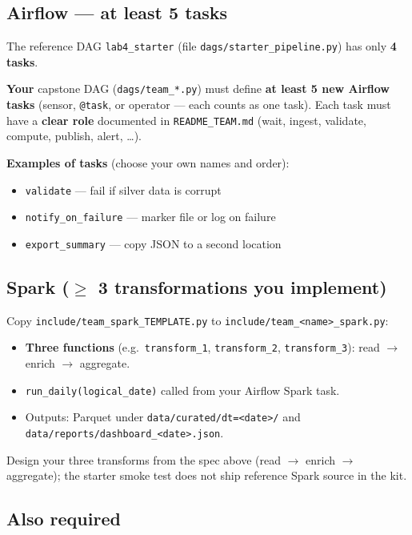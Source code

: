 \documentclass[11pt,a4paper]{article}
\begin{document}
\subsection*{Airflow --- at least 5 tasks}

The reference DAG \texttt{lab4\_starter} (file \texttt{dags/starter\_pipeline.py}) has only \textbf{4 tasks}.

\noindent\textbf{Your} capstone DAG (\texttt{dags/team\_*.py}) must define \textbf{at least 5 new Airflow tasks}
(sensor, \texttt{@task}, or operator --- each counts as one task).
Each task must have a \textbf{clear role} documented in \texttt{README\_TEAM.md}
(wait, ingest, validate, compute, publish, alert, \ldots).

\textbf{Examples of tasks} (choose your own names and order):
\begin{itemize}[nosep]
  \item \texttt{validate} --- fail if silver data is corrupt
  \item \texttt{notify\_on\_failure} --- marker file or log on failure
  \item \texttt{export\_summary} --- copy JSON to a second location
\end{itemize}

\subsection*{Spark ($\geq$ 3 transformations you implement)}

Copy \texttt{include/team\_spark\_TEMPLATE.py} to \texttt{include/team\_<name>\_spark.py}:
\begin{itemize}[nosep]
  \item \textbf{Three functions} (e.g.\ \texttt{transform\_1}, \texttt{transform\_2}, \texttt{transform\_3}):
        read $\rightarrow$ enrich $\rightarrow$ aggregate.
  \item \texttt{run\_daily(logical\_date)} called from your Airflow Spark task.
  \item Outputs: Parquet under \texttt{data/curated/dt=<date>/} and \texttt{data/reports/dashboard\_<date>.json}.
\end{itemize}

Design your three transforms from the spec above (read $\rightarrow$ enrich $\rightarrow$ aggregate); the starter smoke test does not ship reference Spark source in the kit.

\subsection*{Also required}
\end{document}
